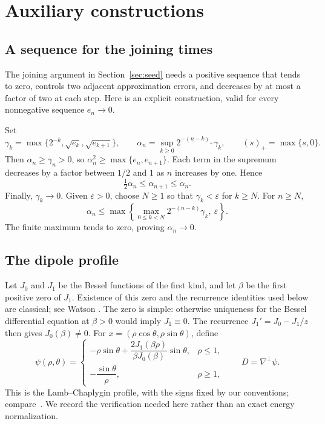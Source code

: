 \documentclass[11pt,a4paper,reqno]{amsart}
\theoremstyle{plain}
\theoremstyle{definition}
\theoremstyle{remark}
\numberwithin{equation}{section}
\begin{document}
\appendix
\section{Auxiliary constructions}\label{app:auxiliary}

\subsection{A sequence for the joining times}\label{app:joining-times}

The joining argument in Section~\ref{sec:seed} needs a positive
sequence that tends to zero, controls two adjacent approximation
errors, and decreases by at most a factor of two at each step.
Here is an explicit construction, valid for every nonnegative
sequence $e_n\to0$.

Set
\[
 \gamma_k=\max\{2^{-k},\sqrt{e_k},\sqrt{e_{k+1}}\},\qquad
 \alpha_n=\sup_{k\ge0}2^{-(n-k)_+}\gamma_k,
 \qquad (s)_+=\max\{s,0\}.
\]
Then $\alpha_n\ge\gamma_n>0$, so
$\alpha_n^2\ge\max\{e_n,e_{n+1}\}$. Each term in the supremum
decreases by a factor between $1/2$ and $1$ as $n$ increases by one.
Hence
\[
 \tfrac12\alpha_n\le\alpha_{n+1}\le\alpha_n.
\]
Finally, $\gamma_k\to0$. Given $\varepsilon>0$, choose $N\ge1$ so that
$\gamma_k<\varepsilon$ for $k\ge N$. For $n\ge N$,
\[
 \alpha_n\le\max\left\{
    \max_{0\le k<N}2^{-(n-k)}\gamma_k,\ \varepsilon\right\}.
\]
The finite maximum tends to zero, proving $\alpha_n\to0$.

\subsection{The dipole profile}\label{app:dipole}

Let $J_0$ and $J_1$ be the Bessel functions of the first kind, and let
$\beta$ be the first positive zero of $J_1$. Existence of this zero
and the recurrence identities used below are classical; see
Watson \cite{Watson}. The zero is simple:
otherwise uniqueness for the Bessel differential equation at
$\beta>0$ would imply $J_1\equiv0$. The recurrence
$J_1'=J_0-J_1/z$ then gives $J_0(\beta)\ne0$.
For $x=(\rho\cos\theta,\rho\sin\theta)$, define
\begin{equation}\label{eq:dipole-stream}
 \psi(\rho,\theta)=
 \begin{cases}
 -\rho\sin\theta+
 \dfrac{2J_1(\beta\rho)}{\beta J_0(\beta)}\sin\theta,
                                      &\rho\le1,\\[4pt]
 -\dfrac{\sin\theta}{\rho},             &\rho\ge1,
 \end{cases}
 \qquad D=\nabla^\perp\psi.
\end{equation}
This is the Lamb--Chaplygin profile, with the signs fixed by our
conventions; compare~\cite[\S2.2]{BCK}. We record the verification needed
here rather than an exact energy normalization.
\end{document}
